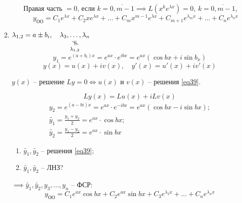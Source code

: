 \begin{note}
\begin{enumerate}
\begin{enumerate}
                        Правая часть $= 0$, если $k = \overline{0,m-1} \implies L(x^ke^{\lambda x}) = 0, \ k=\overline{0,m-1}$,
                        \[
                            y_{\text{ОО}} = C_1e^{\lambda x} + C_2 x e^{\lambda x} + \ldots + C_m x^{m-1} e^{\lambda x} + C_{m+1} e^{\lambda_m x} +\ldots + C_n e^{\lambda_n x}
                        \]
              \end{enumerate}
        \item $\lambda_{1,2} = a\pm b_i, \quad \nequalto{\lambda_3,\ldots,\lambda_n}{\lambda_{1,2}}$
              \[
                  y_1 = e^{(a + b_i)x} = e^{ax}\cdot e^{ibx} = e^{ax}(\cos bx + i \sin b_x)
              \]
              \[
                  y(x) = u(x) + i v(x), \quad y'(x) = u'(x) + iv'(x)
              \]

              \begin{statement}
                  $y(x)$ -- решение $Ly = 0 \iff u(x)$ и $v(x)$ -- решения \ref{eq39}.
              \end{statement}
              \[
                  Ly(x) = Lu(x) + iLv(x)
              \]
              \begin{align*}
                  y_2 = e^{(a-bi)x} = e^{ax}\cdot e^{-ibx} = e^{ax}(\cos bx - i\sin bx); \\
                  \widetilde{y_1} = \frac{y_1 + y_2}{2} = e^{ax} \cdot \cos bx;          \\
                  \widetilde{y_2} = \frac{y_1 - y_2}{2} = e^{ax}\cdot \sin bx
              \end{align*}
              \begin{enumerate}
                  \item $\widetilde{y_1},\widetilde{y_2}$ -- решения \ref{eq39};
                  \item $\widetilde{y_1},\widetilde{y_2}$ -- ЛНЗ?
              \end{enumerate}
              $\implies \widetilde{y_1}, \widetilde{y_2}, y_3, \ldots, y_n$ -- ФСР:
              \[
                  y_{\text{ОО}} = C_1e^{ax}\cos bx + C_2 e^{ax}\sin bx + C_3 e^{\lambda_3x} + \ldots + C_n e^{\lambda_n x}
              \]


\end{enumerate}
\end{note}
